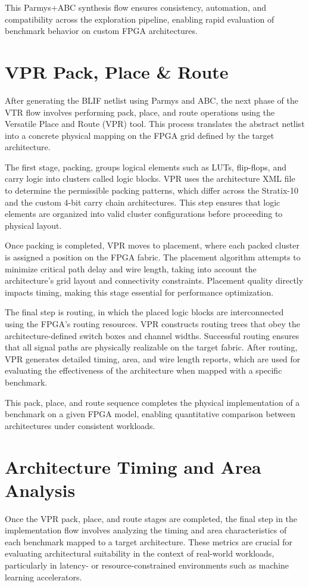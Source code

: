 This Parmys+ABC synthesis flow ensures consistency, automation, and compatibility across the exploration pipeline, enabling rapid evaluation of benchmark behavior on custom FPGA architectures.

\section{VPR Pack, Place \& Route}
After generating the BLIF netlist using Parmys and ABC, the next phase of the VTR flow involves performing pack, place, and route operations using the Versatile Place and Route (VPR) tool. This process translates the abstract netlist into a concrete physical mapping on the FPGA grid defined by the target architecture.

The first stage, packing, groups logical elements such as LUTs, flip-flops, and carry logic into clusters called logic blocks. VPR uses the architecture XML file to determine the permissible packing patterns, which differ across the Stratix-10 and the custom 4-bit carry chain architectures. This step ensures that logic elements are organized into valid cluster configurations before proceeding to physical layout.

Once packing is completed, VPR moves to placement, where each packed cluster is assigned a position on the FPGA fabric. The placement algorithm attempts to minimize critical path delay and wire length, taking into account the architecture’s grid layout and connectivity constraints. Placement quality directly impacts timing, making this stage essential for performance optimization.

The final step is routing, in which the placed logic blocks are interconnected using the FPGA's routing resources. VPR constructs routing trees that obey the architecture-defined switch boxes and channel widths. Successful routing ensures that all signal paths are physically realizable on the target fabric. After routing, VPR generates detailed timing, area, and wire length reports, which are used for evaluating the effectiveness of the architecture when mapped with a specific benchmark.

This pack, place, and route sequence completes the physical implementation of a benchmark on a given FPGA model, enabling quantitative comparison between architectures under consistent workloads.

\section{Architecture Timing and Area Analysis}
Once the VPR pack, place, and route stages are completed, the final step in the implementation flow involves analyzing the timing and area characteristics of each benchmark mapped to a target architecture. These metrics are crucial for evaluating architectural suitability in the context of real-world workloads, particularly in latency- or resource-constrained environments such as machine learning accelerators.

